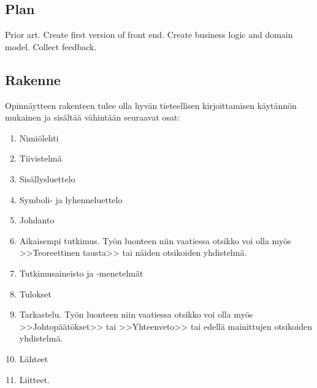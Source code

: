 \documentclass[english,12pt,a4paper,pdftex,elec,utf8]{aaltothesis}
\begin{document}
\subsection{Plan}
Prior art. Create first version of front end. Create business logic and domain model. Collect feedback.



\subsection*{Rakenne}

Opinn\"aytteen rakenteen tulee olla hyv\"an tieteellisen
kirjoittamisen k\"ayt\"ann\"on mukainen ja sis\"alt\"a\"a v\"ahint\"a\"an seuraavat
osat:

\begin{enumerate}
\item Nimi\"olehti
\item Tiivistelm\"a
\item Sis\"allysluettelo
\item Symboli- ja lyhenneluettelo
\item \label{a} Johdanto
\item  Aikaisempi tutkimus. Ty\"on luonteen niin vaatiessa otsikko voi olla my\"os
        >>Teoreettinen tausta>>  tai n\"aiden otsikoiden yhdistelm\"a.
\item Tutkimusaineisto ja -menetelm\"at %
\item Tulokset
\item \label{o} Tarkastelu. Ty\"on luonteen niin vaatiessa otsikko voi
      olla my\"os >>Johtop\"a\"at\"okset>> tai >>Yhteenveto>>
      tai edell\"a mainittujen otsikoiden yhdistelm\"a.
\item L\"ahteet
\item Liitteet.
\end{enumerate}
\end{document}
